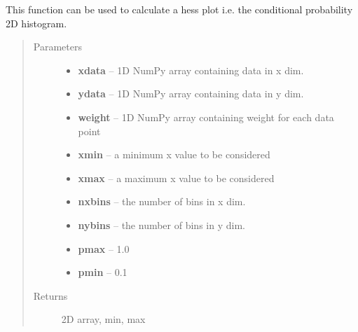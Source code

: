 \documentclass[letterpaper,10pt,english]{sphinxmanual}
\begin{document}
\begin{fulllineitems}
\label{SamPy.astronomy:SamPy.astronomy.hess_plot.hess_plot}
This function can be used to calculate a hess plot
i.e. the conditional probability 2D histogram.
\begin{quote}\begin{description}
\item[{Parameters}] \leavevmode\begin{itemize}
\item {} 
\textbf{xdata} -- 1D NumPy array containing data in x dim.

\item {} 
\textbf{ydata} -- 1D NumPy array containing data in y dim.

\item {} 
\textbf{weight} -- 1D NumPy array containing weight for
each data point

\item {} 
\textbf{xmin} -- a minimum x value to be considered

\item {} 
\textbf{xmax} -- a maximum x value to be considered

\item {} 
\textbf{nxbins} -- the number of bins in x dim.

\item {} 
\textbf{nybins} -- the number of bins in y dim.

\item {} 
\textbf{pmax} -- 1.0

\item {} 
\textbf{pmin} -- 0.1

\end{itemize}

\item[{Returns}] \leavevmode
2D array, min, max

\end{description}\end{quote}

\end{fulllineitems}


\end{document}
